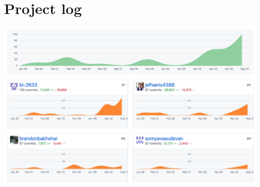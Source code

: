 \documentclass[./Report_main.tex]{subfiles}
\begin{document}
\section{Project log}
\includegraphics[scale = 0.5]{github_stats.png}

\end{document}
